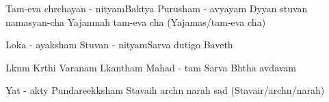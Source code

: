 \documentclass[10pt]{article}
\begin{document}













\slokas
{Tam-eva chrchayan - nityam}{Baktya Purusham - avyayam}
{Dyyan stuvan namasyan-cha} {Yajamnah tam-eva cha (Yajamas/tam-eva cha)}


{Loka - ayaksham Stuvan - nityam}{Sarva dutigo Baveth}

 {Lknm Krthi Varanam}
{Lkantham Mahad - tam} {Sarva Bhtha avdavam}

{Yat - akty Pundareekksham} {Stavaih archn narah sad (Stavair/archn/narah)}
\end{document}
